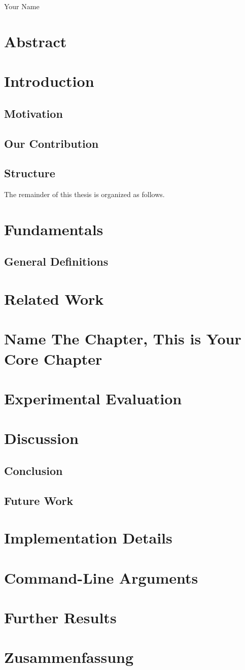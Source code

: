 \documentclass[a4paper,12pt,bibtotoc,titlepage, liststotoc,BCOR7mm,headsepline,pointlessnumbers]{scrbook}
\newcommand{\upbautor}{Your Name} %
\theoremstyle{break} %
\begin{document}
\upbautor
\pagebreak
	
\chapter*{Abstract}
	
	\tableofcontents
	
	\mainmatter
	\newpage
\chapter{Introduction}
\section{Motivation}
\section{Our Contribution}
\section{Structure}
The remainder of this thesis is organized as follows.
	\newpage
\chapter{Fundamentals}
\section{General Definitions}
\chapter{Related Work}
\chapter{Name The Chapter, This is Your Core Chapter}
\chapter{Experimental Evaluation}
\chapter{Discussion}
\section{Conclusion}
\section{Future Work}
\appendix
\chapter*{Implementation Details}
\chapter*{Command-Line Arguments}
\chapter*{Further Results}
\chapter*{Zusammenfassung}
\newpage
\backmatter


\end{document}
